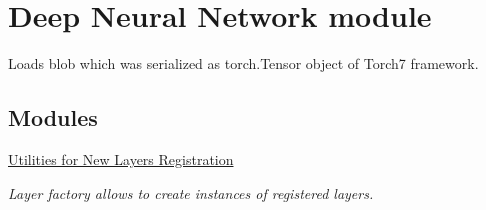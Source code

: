 \hypertarget{group__dnn}{}\section{Deep Neural Network module}
\label{group__dnn}


Loads blob which was serialized as torch.\+Tensor object of Torch7 framework.  


\subsection*{Modules}
\begin{DoxyCompactItemize}
\item 
\hyperlink{group__dnn_layer_factory}{Utilities for New Layers Registration}
\begin{DoxyCompactList}\small\item\em Layer factory allows to create instances of registered layers. \end{DoxyCompactList}\end{DoxyCompactItemize}
